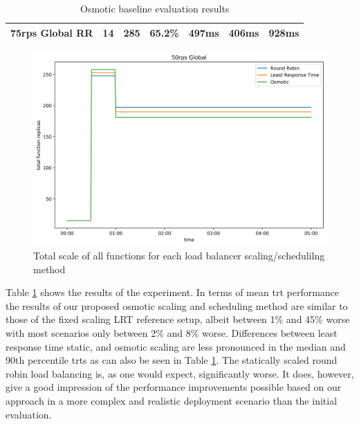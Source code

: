 \documentclass[draft,final]{vutinfth} %
\begin{document}
\begin{table}[]
\begin{tabular}{lrrrrrr}
75rps Global RR      & 14                                                             & 285                                                                                       & 65.2\%                                                                        & 497ms                                                       & 406ms                                                         & 928ms                                                      \\ \hline
\end{tabular}
\caption{Osmotic baseline evaluation results}
\label{tab:osmotic_base}
\end{table}

\begin{figure}
    \centering
    \includegraphics[width=12cm]{graphics/graphs/osmotic_base_function_scale_by_lb.png}
    \caption{Total scale of all functions for each load balancer scaling/schedulilng method}
    \label{fig:osmotic_fx_scale_by_scaling}
\end{figure}

Table \ref{tab:osmotic_base} shows the results of the experiment.
In terms of mean \gls{trt} performance the results of our proposed osmotic scaling and scheduling method are similar to those of the fixed scaling LRT reference setup, albeit between 1\% and 45\% worse with most scenarios only between 2\% and 8\% worse.
Differences between least response time static, and osmotic scaling are less pronounced in the median and 90th percentile \glspl{trt} as can also be seen in Table \ref{tab:osmotic_base}.
The statically scaled round robin load balancing is, as one would expect, significantly worse.
It does, however, give a good impression of the performance improvements possible based on our approach in a more complex and realistic deployment scenario than the initial evaluation.
\end{document}
